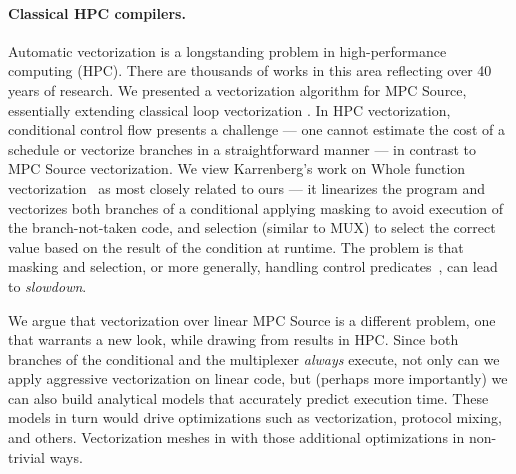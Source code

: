 \paragraph{Classical HPC compilers.}
Automatic vectorization is a longstanding problem in high-performance computing (HPC).
There are thousands of works in this area reflecting over 40 years of research. We presented a vectorization
algorithm for MPC Source, essentially extending classical loop vectorization \cite{Allen:1987}. In HPC vectorization, conditional control flow
presents a challenge --- one cannot estimate the cost of a schedule or vectorize branches in a straightforward manner --- in contrast to
MPC Source vectorization.
We view Karrenberg's work on Whole function vectorization~\cite{Karrenberg:2015} as most closely related to ours --- it linearizes the program and vectorizes
both branches of a conditional applying masking to avoid execution of the branch-not-taken code, and selection (similar to MUX) to select the correct value based on the
result of the condition at runtime.
The problem is that masking and selection, or more generally, handling control predicates~\cite{Benabderrahmane:2010,Karrenberg:2015},
can lead to \emph{slowdown}.

We argue that vectorization over linear MPC Source is a different problem, one that warrants a new look, while drawing from
results in HPC.
Since both branches of the conditional and the multiplexer \emph{always} execute, not only can we apply aggressive vectorization on linear code, but (perhaps more importantly)
we can also build analytical models that accurately predict execution time. These models in turn would drive optimizations such as vectorization, protocol mixing, and others.
Vectorization meshes in with those additional optimizations in non-trivial ways.

